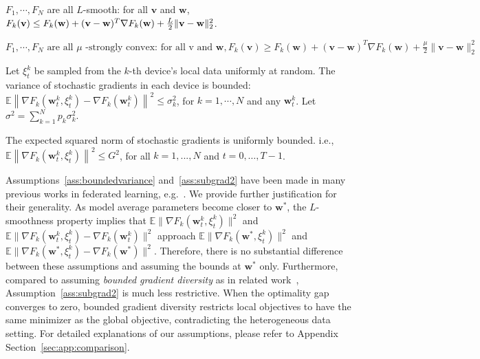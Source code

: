 
\begin{assumption}[L-smooth]
	$F_{1}, \cdots, F_{N}$ are all $L$-smooth: for all  $\mathbf{v}$  and $\mathbf{w}$, $F_{k}(\mathbf{v}) \leq F_{k}(\mathbf{w})+(\mathbf{v}- \\ \mathbf{w})^{T} \nabla F_{k}(\mathbf{w})+\frac{L}{2}\|\mathbf{v}-\mathbf{w}\|_{2}^{2}$.
	\label{ass:lsmooth}
\end{assumption}
\begin{assumption}
	$	F_{1}, \cdots, F_{N} \text { are all } \mu \text { -strongly convex: for all v and } \mathbf{w}, F_{k}(\mathbf{v}) \geq F_{k}(\mathbf{w})+(\mathbf{v}-\mathbf{w})^{T} \nabla F_{k}(\mathbf{w})+\frac{\mu}{2}\|\mathbf{v}-\mathbf{w}\|_{2}^{2}$
	\label{ass:stroncvx}
\end{assumption}
\begin{assumption}
	Let $\xi_{t}^{k}$ be sampled from the $k$-th device's local data uniformly at random. The variance of stochastic gradients in each device is bounded: $\mathbb{E}\left\|\nabla F_{k}\left(\mathbf{w}_{t}^{k}, \xi_{t}^{k}\right)-\nabla F_{k}\left(\mathbf{w}_{t}^{k}\right)\right\|^{2} \leq \sigma_{k}^{2}$,
	for $k=1, \cdots, N$ and any $\mathbf{w}_{t}^{k}$. Let $\sigma^2=\sum_{k=1}^{N}p_k\sigma_{k}^{2}$.
	\label{ass:boundedvariance}
\end{assumption}
\begin{assumption}
	The expected squared norm of stochastic gradients is uniformly bounded. i.e.,
	$\mathbb{E}\left\|\nabla F_{k}\left(\mathbf{w}_{t}^{k}, \xi_{t}^{k}\right)\right\|^{2} \leq G^{2}$, for all $k = 1,..., N$ and $t=0, \dots, T-1$.
	\label{ass:subgrad2}
\end{assumption}
Assumptions~\ref{ass:boundedvariance} and~\ref{ass:subgrad2} have been made in many previous
works in federated learning, e.g.~\cite{yu2019parallel,li2019convergence,stich2018local}. We provide further justification for their generality. As model average parameters become
closer to $\mathbf{w}^{\ast}$, the $L$-smoothness property implies
that $\mathbb{E}\|\nabla F_{k}(\mathbf{w}_{t}^{k},\xi_{t}^{k})\|^{2}$
and $\mathbb{E}\|\nabla F_{k}(\mathbf{w}_{t}^{k},\xi_{t}^{k})-\nabla F_{k}(\mathbf{w}_{t}^{k})\|^{2}$
approach $\mathbb{E}\|\nabla F_{k}(\mathbf{w}^{\ast},\xi_{t}^{k})\|^{2}$
and $\mathbb{E}\|\nabla F_{k}(\mathbf{w}^{\ast},\xi_{t}^{k})-\nabla F_{k}(\mathbf{w}^{\ast})\|^{2}$.
Therefore, there is no substantial difference between these assumptions
and assuming the bounds at $\mathbf{w}^{\ast}$ only. Furthermore, compared to assuming \textit{bounded gradient diversity} as in related work~\cite{haddadpour2019convergence,li2018federated}, Assumption~\ref{ass:subgrad2} is much less restrictive. When the optimality gap converges to zero,
bounded gradient diversity restricts local objectives to have the same minimizer as the global objective, contradicting the heterogeneous data setting. 
For detailed explanations of our assumptions, please refer to Appendix Section~\ref{sec:app:comparison}.

